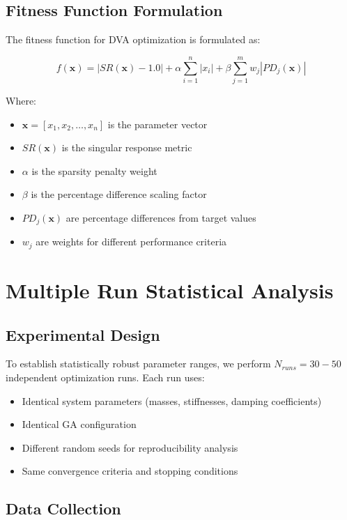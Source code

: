 \documentclass[../main.tex]{subfiles}
\begin{document}
\subsection{Fitness Function Formulation}

The fitness function for DVA optimization is formulated as:

\begin{equation}
f(\mathbf{x}) = |SR(\mathbf{x}) - 1.0| + \alpha \sum_{i=1}^{n} |x_i| + \beta \sum_{j=1}^{m} w_j |PD_j(\mathbf{x})|
\label{eq:fitness}
\end{equation}

Where:
\begin{itemize}
    \item $\mathbf{x} = [x_1, x_2, \dots, x_n]$ is the parameter vector
    \item $SR(\mathbf{x})$ is the singular response metric
    \item $\alpha$ is the sparsity penalty weight
    \item $\beta$ is the percentage difference scaling factor
    \item $PD_j(\mathbf{x})$ are percentage differences from target values
    \item $w_j$ are weights for different performance criteria
\end{itemize}

\section{Multiple Run Statistical Analysis}

\subsection{Experimental Design}

To establish statistically robust parameter ranges, we perform $N_{runs} = 30-50$ independent optimization runs. Each run uses:
\begin{itemize}
    \item Identical system parameters (masses, stiffnesses, damping coefficients)
    \item Identical GA configuration
    \item Different random seeds for reproducibility analysis
    \item Same convergence criteria and stopping conditions
\end{itemize}

\subsection{Data Collection}
\end{document}
